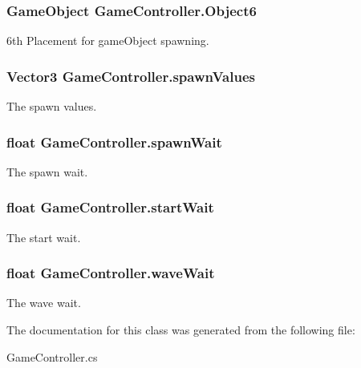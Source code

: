 \hypertarget{classGameController_abdd174d29ced81c8cb34bdac98018e03}{
\subsubsection[{Object6}]{\setlength{\rightskip}{0pt plus 5cm}Game\-Object Game\-Controller.\-Object6}}\label{classGameController_abdd174d29ced81c8cb34bdac98018e03}


6th Placement for game\-Object spawning. 

\hypertarget{classGameController_a5e4f56c23896d4b528da579f93335896}{
\subsubsection[{spawn\-Values}]{\setlength{\rightskip}{0pt plus 5cm}Vector3 Game\-Controller.\-spawn\-Values}}\label{classGameController_a5e4f56c23896d4b528da579f93335896}


The spawn values. 

\hypertarget{classGameController_a27c91a14de3982813ad3d8245d0134d7}{
\subsubsection[{spawn\-Wait}]{\setlength{\rightskip}{0pt plus 5cm}float Game\-Controller.\-spawn\-Wait}}\label{classGameController_a27c91a14de3982813ad3d8245d0134d7}


The spawn wait. 

\hypertarget{classGameController_a9b6f96c29d3ee0f2c692c30ed2b12835}{
\subsubsection[{start\-Wait}]{\setlength{\rightskip}{0pt plus 5cm}float Game\-Controller.\-start\-Wait}}\label{classGameController_a9b6f96c29d3ee0f2c692c30ed2b12835}


The start wait. 

\hypertarget{classGameController_ad210270b367c1c439d35e8177d989019}{
\subsubsection[{wave\-Wait}]{\setlength{\rightskip}{0pt plus 5cm}float Game\-Controller.\-wave\-Wait}}\label{classGameController_ad210270b367c1c439d35e8177d989019}


The wave wait. 



The documentation for this class was generated from the following file\-:\begin{DoxyCompactItemize}
\item 
Game\-Controller.\-cs\end{DoxyCompactItemize}
